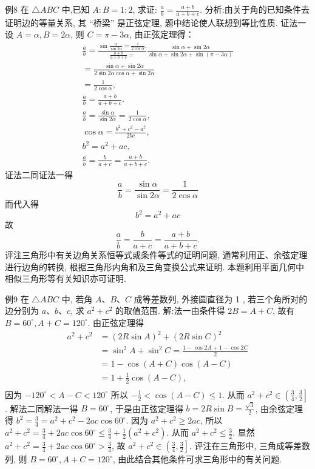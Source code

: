 例8 在 $\triangle A B C$ 中,已知 $A: B=1: 2$, 求证: $\frac{a}{b}=\frac{a+b}{a+b+c}$.
分析:由关于角的已知条件去证明边的等量关系, 其 “桥梁” 是正弦定理, 题中结论使人联想到等比性质.
证法一设 $A=\alpha, B=2 \alpha$, 则 $C=\pi-3 \alpha$, 由正弦定理得：
$$
\begin{gathered}
\frac{a}{b}=\frac{\sin \frac{\alpha}{\sin 2 \alpha}=\frac{1}{2 \cos \alpha} .}{\frac{a+b}{a+b+c}=} \frac{\sin \alpha+\sin 2 \alpha}{\sin \alpha+\sin 2 \alpha+\sin (\pi-3 \alpha)} \\
=\frac{\sin \alpha+\sin 2 \alpha}{2 \sin 2 \alpha \cos \alpha+\sin 2 \alpha} \\
=\frac{1}{2 \cos \alpha}, \\
\frac{a}{b}=\frac{a+b}{a+b+c} . \\
\frac{a}{b}=\frac{\sin \alpha}{\sin 2 \alpha}=\frac{1}{2 \cos \alpha}, \\
\cos \alpha=\frac{b^2+c^2-a^2}{2 b c}, \\
b^2=a^2+a c, \\
\frac{a}{b}=\frac{b}{a+c}=\frac{a+b}{a+b+c} .
\end{gathered}
$$
证法二同证法一得
$$
\frac{a}{b}=\frac{\sin \alpha}{\sin 2 \alpha}=\frac{1}{2 \cos \alpha}
$$
而代入得
$$
b^2=a^2+a c
$$
故
$$
\frac{a}{b}=\frac{b}{a+c}=\frac{a+b}{a+b+c} .
$$
评注三角形中有关边角关系恒等式或条件等式的证明问题, 通常利用正、余弦定理进行边角的转换, 根据三角形内角和及三角变换公式来证明.
本题利用平面几何中相似三角形等有关知识亦可证明.



例9 在 $\triangle A B C$ 中, 若角 $A 、 B 、 C$ 成等差数列, 外接圆直径为 1 , 若三个角所对的边分别为 $a 、 b 、 c$, 求 $a^2+c^2$ 的取值范围.
解:法一由条件得 $2 B=A+C$, 故有 $B=60^{\circ}, A+C=120^{\circ}$.
由正弦定理得 
$$
\begin{aligned}
a^2+c^2 & =(2 R \sin A)^2+(2 R \sin C)^2 \\
& =\sin ^2 A+\sin ^2 C=\frac{1-\cos 2 A+1-\cos 2 C}{2} \\
& =1-\cos (A+C) \cos (A-C) \\
& =1+\frac{1}{2} \cos (A-C), \\
\end{aligned}
$$
因为 $-120^{\circ}<A-C<120^{\circ}$
所以 $-\frac{1}{2}<\cos (A-C) \leqslant 1$. 从而 $a^2+c^2 \in\left(\frac{3}{4}, \frac{3}{2}\right]$.
解法二同解法一得 $B=60^{\circ}$, 于是由正弦定理得 $b=2 R \sin B=\frac{\sqrt{3}}{2}$, 由余弦定理得 $b^2=\frac{3}{4}=a^2+c^2-2 a c \cos 60^{\circ}$.
因为 $a^2+c^2 \geqslant 2 a c$, 所以 $a^2+c^2=\frac{3}{4}+2 a c \cos 60^{\circ} \leqslant \frac{3}{4}+\frac{1}{2}\left(a^2+c^2\right)$. 从而 $a^2+c^2 \leqslant \frac{3}{2}$.
显然 $a^2+c^2=\frac{3}{4}+2 a c \cos 60^{\circ}>\frac{3}{4}$, 故 $a^2+c^2 \in\left(\frac{3}{4}, \frac{3}{2}\right]$.
评注在三角形中, 三角成等差数列, 则 $B=60^{\circ}, A+C=120^{\circ}$, 由此结合其他条件可求三角形中的有关问题.



